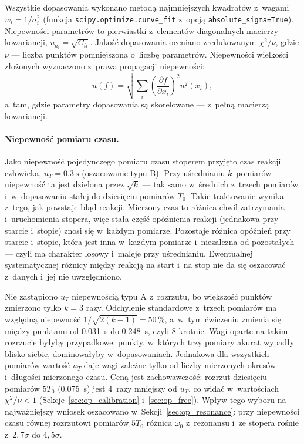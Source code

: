 \documentclass[12pt, a4paper]{article}
\begin{document}
Wszystkie dopasowania wykonano metodą najmniejszych kwadratów z~wagami
$w_i = 1/\sigma_i^2$ (funkcja \texttt{scipy.optimize.curve\_fit} z~opcją
\texttt{absolute\_sigma=True}). Niepewności parametrów to pierwiastki z~elementów
diagonalnych macierzy kowariancji, $u_{a_i} = \sqrt{C_{ii}}$. Jakość dopasowania
oceniano zredukowanym $\chi^2/\nu$, gdzie $\nu$ --- liczba punktów pomniejszona
o~liczbę parametrów. Niepewności wielkości złożonych wyznaczono z~prawa propagacji
niepewności:
\begin{equation}
    u(f) = \sqrt{\sum_i \left(\frac{\partial f}{\partial x_i}\right)^2 u^2(x_i)},
    \label{eq:propagation}
\end{equation}
a~tam, gdzie parametry dopasowania są skorelowane --- z~pełną macierzą kowariancji.

\paragraph{Niepewność pomiaru czasu.}
Jako niepewność pojedynczego pomiaru czasu stoperem przyjęto czas reakcji człowieka,
$u_T = \SI{0.3}{\second}$ (oszacowanie typu B). Przy uśrednianiu $k$~pomiarów niepewność
ta jest dzielona przez $\sqrt{k}$ --- tak samo w~średnich z~trzech pomiarów
i~w~dopasowaniu stałej do dziesięciu pomiarów $T_0$. Takie traktowanie wynika z~tego,
jak powstaje błąd reakcji. Mierzony czas to różnica chwil zatrzymania i~uruchomienia
stopera, więc stała część opóźnienia reakcji (jednakowa przy starcie i~stopie) znosi
się w~każdym pomiarze. Pozostaje różnica opóźnień przy starcie i~stopie, która jest inna
w~każdym pomiarze i~niezależna od pozostałych --- czyli ma charakter losowy i~maleje przy
uśrednianiu. Ewentualnej systematycznej różnicy między reakcją na start i~na stop nie
da się oszacować z~danych i~jej nie uwzględniono.

Nie zastąpiono $u_T$ niepewnością typu A z~rozrzutu, bo większość punktów zmierzono
tylko $k = 3$ razy. Odchylenie standardowe z~trzech pomiarów ma względną niepewność
$1/\sqrt{2(k-1)} = 50\,\%$, a~w~tym ćwiczeniu zmienia się między punktami od
\SI{0.031}{\second} do \SI{0.248}{\second}, czyli 8-krotnie. Wagi oparte na takim
rozrzucie byłyby przypadkowe: punkty, w~których trzy pomiary akurat wypadły blisko
siebie, dominowałyby w~dopasowaniach. Jednakowa dla wszystkich pomiarów wartość $u_T$
daje wagi zależne tylko od liczby mierzonych okresów i~długości mierzonego czasu.
Ceną jest zachowawczość: rozrzut dziesięciu pomiarów $5T_0$ (\SI{0.075}{\second})
jest 4~razy mniejszy od $u_T$, co widać w~wartościach $\chi^2/\nu < 1$
(Sekcje~\ref{sec:op_calibration} i~\ref{sec:op_free}). Wpływ tego wyboru na
najważniejszy wniosek oszacowano w~Sekcji~\ref{sec:op_resonance}: przy niepewności
czasu równej rozrzutowi pomiarów $5T_0$ różnica $\omega_0$ z~rezonansu i~ze stopera
rośnie z~$2{,}7\sigma$ do $4{,}5\sigma$.
\end{document}
